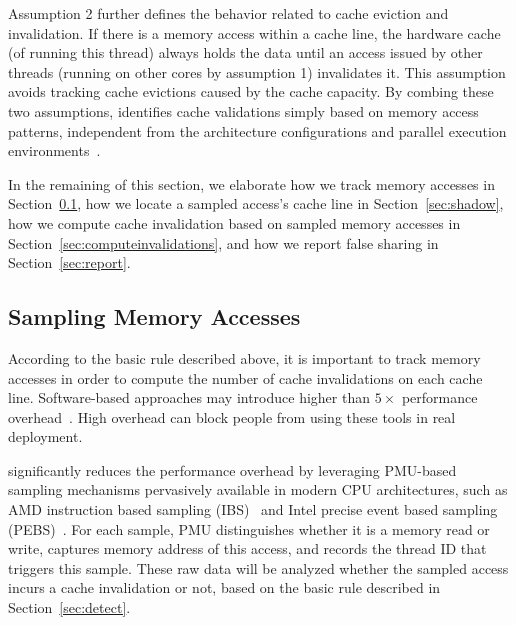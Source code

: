 Assumption 2 further defines the behavior related to cache eviction and invalidation. 
If there is a memory access within a cache line, the hardware cache (of running this thread) always holds the data until an access issued by other threads (running on other cores by assumption 1) invalidates it. This assumption avoids tracking cache evictions caused by the cache capacity. 
By combing these two assumptions, \cheetah{} identifies cache validations simply based on memory access patterns, independent from the architecture configurations and parallel execution environments~\cite{Predator, qinzhao}. 

In the remaining of this section, we elaborate how we track memory accesses in Section~\ref{sec:perfcounter}, how we locate a sampled access's cache line in Section~\ref{sec:shadow}, how we compute cache invalidation based on sampled memory accesses in Section~\ref{sec:computeinvalidations}, and how we report false sharing in Section~\ref{sec:report}.

\subsection{Sampling Memory Accesses}
\label{sec:perfcounter}

According to the basic rule described above, it is important to track memory accesses in order to compute the number of cache invalidations on each cache line. Software-based approaches may introduce higher than $5\times$ performance overhead~\cite{Predator, qinzhao}. High overhead can block people from using these tools in real deployment.

\cheetah{} significantly reduces the performance overhead by leveraging PMU-based sampling mechanisms pervasively available in modern CPU architectures, such as AMD instruction based sampling (IBS)~\cite{AMDIBS:07} and Intel precise event based sampling (PEBS)~\cite{IntelArch:PEBS:Sept09}. For each sample, PMU distinguishes whether it is a memory read or write, captures memory address of this access, and records the thread ID that triggers this sample. These raw data will be analyzed whether the sampled access incurs a cache invalidation or not, based on the basic rule described in Section~\ref{sec:detect}.

